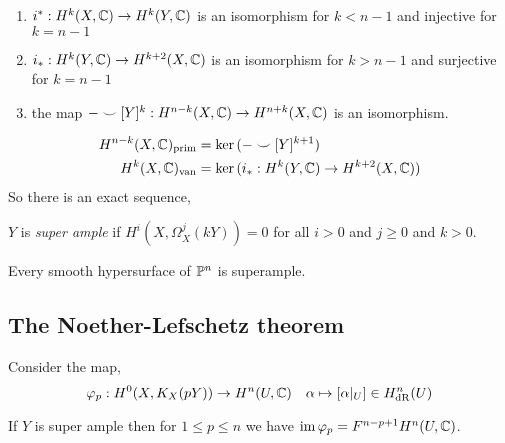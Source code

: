 \documentclass[12pt]{article}
\begin{document}
\begin{theorem}
\begin{enumerate}
\item $i^* : H^k(X, \CC) \to H^k(Y, \CC)$ is an isomorphism for $k < n-1$ and injective for $k = n-1$
\item $i_* : H^k(Y, \CC) \to H^{k+2}(X, \CC)$ is an isomorphism for $k > n - 1$ and surjective for $k = n - 1$
\item the map $- \smile [Y]^k : H^{n-k}(X, \CC) \to H^{n+k}(X, \CC)$ is an isomorphism.
\end{enumerate}
\end{theorem}

\begin{defn}
\begin{align*}
H^{n-k}(X, \CC)_{\prim} & = \ker{(- \smile [Y]^{k+1})}
\\
H^k(X, \CC)_{\van} & = \ker{(i_* : H^k(Y, \CC) \to H^{k+2}(X, \CC))}
\end{align*}
So there is an exact sequence,
\begin{center}
\end{center}
\end{defn}

\begin{defn}
$Y$ is \textit{super ample} if $H^i(X, \Omega^j_X(kY)) = 0$ for all $i > 0$ and $j \ge 0$ and $k > 0$.
\end{defn}

\begin{example}
Every smooth hypersurface of $\P^n$ is superample. 
\end{example}

\subsection{The Noether-Lefschetz theorem}


Consider the map,
\[ \varphi_p : H^0(X, K_X(pY)) \to H^n(U, \CC) \quad \alpha \mapsto [\alpha|_U] \in H^n_{\dR}(U) \]

\begin{theorem}[Griffiths, 1969]
If $Y$ is super ample then for $1 \le p \le n$ we have $\im{\varphi_p} = F^{n-p+1} H^n(U, \CC)$.
\end{theorem}
\end{document}
